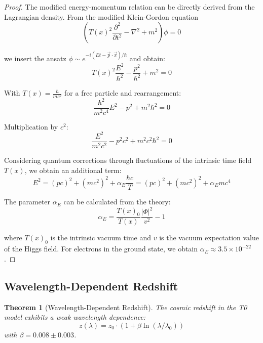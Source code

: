 \documentclass{article}
\newtheorem{theorem}{Theorem}[section]
\theoremstyle{definition}
\theoremstyle{remark}
\newcommand{\Tfield}{T(x)} %
\begin{document}
	\begin{proof}
		The modified energy-momentum relation can be directly derived from the Lagrangian density. From the modified Klein-Gordon equation
		\begin{equation}
			\left(\Tfield^2\frac{\partial^2}{\partial t^2} - \nabla^2 + m^2\right) \phi = 0
		\end{equation}
		
		we insert the ansatz $\phi \sim e^{-i(Et-\vec{p}\cdot\vec{x})/\hbar}$ and obtain:
		\begin{equation}
			\Tfield^2 \frac{E^2}{\hbar^2} - \frac{p^2}{\hbar^2} + m^2 = 0
		\end{equation}
		
		With $\Tfield = \frac{\hbar}{mc^2}$ for a free particle and rearrangement:
		\begin{equation}
			\frac{\hbar^2}{m^2c^4}E^2 - p^2 + m^2\hbar^2 = 0
		\end{equation}
		
		Multiplication by $c^2$:
		\begin{equation}
			\frac{E^2}{m^2c^2} - p^2c^2 + m^2c^2\hbar^2 = 0
		\end{equation}
		
		Considering quantum corrections through fluctuations of the intrinsic time field $\Tfield$, we obtain an additional term:
		\begin{equation}
			E^2 = (pc)^2 + (mc^2)^2 + \alpha_E\frac{\hbar c}{T} = (pc)^2 + (mc^2)^2 + \alpha_E mc^4
		\end{equation}
		
		The parameter $\alpha_E$ can be calculated from the theory:
		\begin{equation}
			\alpha_E = \frac{\Tfield_0}{\Tfield} \frac{|\Phi|^2}{v^2} - 1
		\end{equation}
		
		where $\Tfield_0$ is the intrinsic vacuum time and $v$ is the vacuum expectation value of the Higgs field. For electrons in the ground state, we obtain $\alpha_E \approx 3.5 \times 10^{-22}$.
	\end{proof}
	
	\subsection{Wavelength-Dependent Redshift}
	
	\begin{theorem}[Wavelength-Dependent Redshift]
		The cosmic redshift in the T0 model exhibits a weak wavelength dependence:
		\begin{equation}
			z(\lambda) = z_0 \cdot (1 + \beta\ln(\lambda/\lambda_0))
		\end{equation}
		with $\beta = 0.008 \pm 0.003$.
	\end{theorem}
	
\end{document}
